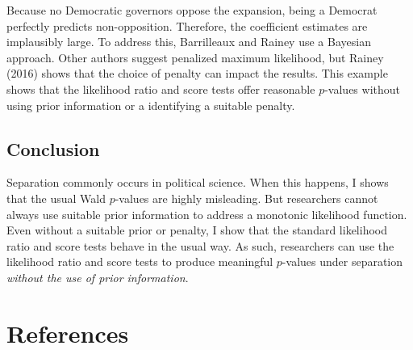 \documentclass[
]{article}
\begin{document}
Because no Democratic governors oppose the expansion, being a Democrat
perfectly predicts non-opposition. Therefore, the coefficient estimates
are implausibly large. To address this, Barrilleaux and Rainey use a
Bayesian approach. Other authors suggest penalized maximum likelihood,
but Rainey (2016) shows that the choice of penalty can impact the
results. This example shows that the likelihood ratio and score tests
offer reasonable \(p\)-values without using prior information or a
identifying a suitable penalty.

\hypertarget{conclusion}{%
\subsection{Conclusion}\label{conclusion}}

Separation commonly occurs in political science. When this happens, I
shows that the usual Wald \(p\)-values are highly misleading. But
researchers cannot always use suitable prior information to address a
monotonic likelihood function. Even without a suitable prior or penalty,
I show that the standard likelihood ratio and score tests behave in the
usual way. As such, researchers can use the likelihood ratio and score
tests to produce meaningful \(p\)-values under separation \emph{without
the use of prior information}.

\hypertarget{references}{%
\section{References}\label{references}}
\end{document}
